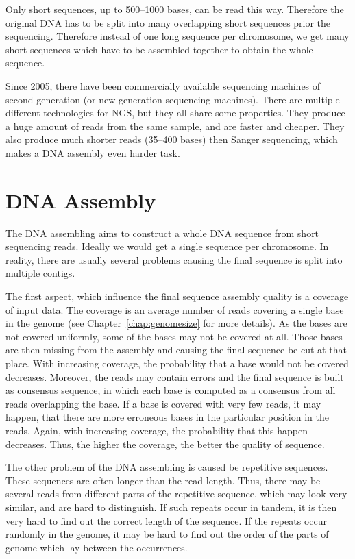 Only short sequences, up to 500--1000 bases, can be read this way. Therefore the original DNA has to be split into many overlapping short sequences prior the sequencing.
Therefore instead of one long sequence per chromosome, we get many short sequences which have to be assembled together to obtain the whole sequence.

Since 2005, there have been commercially available sequencing machines of second generation (or new generation sequencing machines). There are multiple different technologies for NGS, but they all share some properties.
They produce a huge amount of reads from the same sample, and are faster and cheaper. They also produce much shorter reads (35--400 bases) then Sanger sequencing, which makes a DNA assembly even harder task.

\section{DNA Assembly}

The DNA assembling aims to construct a whole DNA sequence from short sequencing reads. Ideally we would get a single sequence per chromosome. In reality, there are usually several problems causing the final sequence is split into multiple contigs.

The first aspect, which influence the final sequence assembly quality is a coverage of input data. The coverage is an average number of reads covering a single base in the genome (see Chapter~\ref{chap:genomesize} for more details).
As the bases are not covered uniformly, some of the bases may not be covered at all. Those bases are then missing from the assembly and causing the final sequence be cut at that place. With increasing coverage, the probability that a base would not be covered decreases.
Moreover, the reads may contain errors and the final sequence is built as consensus sequence, in which each base is computed as a consensus from all reads overlapping the base. If a base is covered with very few reads, it may happen, that there are more erroneous bases in the particular position in the reads. Again, with increasing coverage, the probability that this happen decreases. Thus, the higher the coverage, the better the quality of sequence.

The other problem of the DNA assembling is caused be repetitive sequences. These sequences are often longer than the read length. Thus, there may be several reads from different parts of the repetitive sequence, which may look very similar, and are hard to distinguish. If such repeats occur in tandem, it is then very hard to find out the correct length of the sequence. If the repeats occur randomly in the genome, it may be hard to find out the order of the parts of genome which lay between the occurrences.

